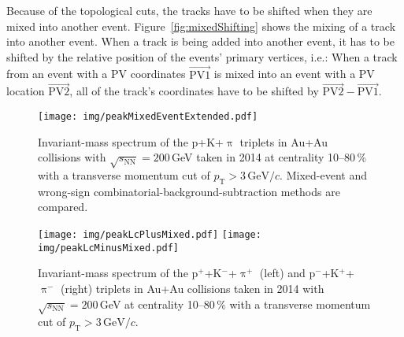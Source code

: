 Because of the topological cuts, the tracks have to be shifted when they are mixed into another event. Figure~\ref{fig:mixedShifting} shows the mixing of a track into another event. When a track is being added into another event, it has to be shifted by the relative position of the events' primary vertices, i.e.: When a track from an event with a PV coordinates $\overrightarrow{\mathrm{PV1}}$ is mixed into an event with a PV location $\overrightarrow{\mathrm{PV2}}$, all of the track's coordinates have to be shifted by $\overrightarrow{\mathrm{PV2}} - \overrightarrow{\mathrm{PV1}}$\@.

\begin{figure}[!htb]
\centering
\texttt{[image: img/peakMixedEventExtended.pdf]}
\caption[Comparison of the mixed-event and wrong-sign combinatorial-background-subtraction methods.]{\label{fig:extendedMixed}Invariant-mass spectrum of the p+K+$\uppi$ triplets in Au+Au collisions with $\sqrt{s_\mathrm{NN}} = 200\,$GeV taken in 2014 at centrality 10--80$\,\%$ with a transverse momentum cut of $p_\mathrm{T} > 3\,\text{GeV}/c$. Mixed-event and wrong-sign combinatorial-background-subtraction methods are compared.}
\end{figure}


\begin{figure}[!htb]
\centering
\texttt{[image: img/peakLcPlusMixed.pdf]}
\texttt{[image: img/peakLcMinusMixed.pdf]}
\caption[\Lcplus\ and \Lcminus\ invariant-mass peaks, using the mixed-event method for subtraction of the combinatorial background.]{\label{fig:chargesMixed}Invariant-mass spectrum of the p$^+$+K$^-$+$\uppi^+$ (left) and p$^-$+K$^+$+$\uppi^-$ (right) triplets in Au+Au collisions taken in 2014 with $\sqrt{s_\mathrm{NN}} = 200\,$GeV at centrality 10--80$\,\%$ with a transverse momentum cut of $p_\mathrm{T} > 3\,\text{GeV}/c$.}
\end{figure}

